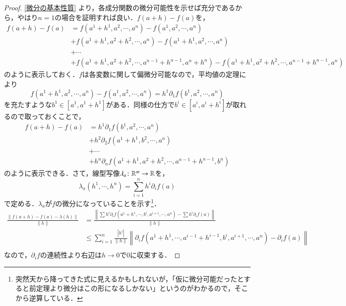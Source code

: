 \begin{proof}
\cref{微分の基本性質} より，各成分関数の微分可能性を示せば充分であるから，やはり$n=1$の場合を証明すれば良い．$f(a+h) - f(a)$を，
\begin{align}
f(a+h) - f(a) &= f(a^1+h^1, a^2, \cdots, a^n) - f(a^1 , a^2, \cdots, a^n) \\
&+ f(a^1+h^1, a^2+h^2, \cdots, a^n) - f(a^1+h^1 , a^2, \cdots, a^n) \\
&+ \cdots \\
&+ f(a^1+h^1, a^2+h^2, \cdots, a^{n-1}+h^{n-1} ,a^n+h^n) - f(a^1+h^1 , a^2+h^2, \cdots, a^{n-1} +h^{n-1}, a^n)
\end{align}のように表示しておく．$f$は各変数に関して偏微分可能なので，平均値の定理により
\begin{equation}
f(a^1+h^1, a^2, \cdots, a^n) - f(a^1 , a^2, \cdots, a^n) = h^1 \partial_1 f(b^1, a^2, \cdots, a^n)
\end{equation}を充たすような$b^1 \in [a^1, a^1 + h^1]$がある．同様の仕方で$b^i \in [a^i, a^i+h^i]$が取れるので取っておくことで，
\begin{align}
f(a+h) - f(a) &= h^1 \partial_1 f(b^1, a^2, \cdots, a^n) \\
&+ h^2 \partial_2 f(a^1+h^1, b^2, \cdots, a^n) \\
&+ \cdots \\
&+ h^n \partial_n f(a^1+h^1, a^2+h^2, \cdots, a^{n-1}+h^{n-1} ,b^n)
\end{align}のように表示できる．さて，線型写像$\lambda_a \colon \mathbb{R}^m \to \mathbb{R}$を，
\begin{equation}
\lambda_a(h^1, \cdots, h^n) = \sum_{i=1}^n h^i \partial_i f(a)
\end{equation}で定める．$\lambda_a$が$f$の微分になっていることを示す\footnote{突然天から降ってきた式に見えるかもしれないが，「仮に微分可能だったとすると前定理より微分はこの形になるしかない」というのがわかるので，そこから逆算している．}．
\begin{align}
\frac{\|f(a+h)- f(a) - \lambda(h)\|}{\|h\|} &= \frac{\left\| \sum h^i \partial_i f(a^1+h^1, \cdots, b^i, a^{i+1}, \cdots, a^n)  - \sum h^i \partial_i f(a) \right\|}{\|h\|} \\
&\leq \sum_{i=1}^n \frac{ \left|h^i\right|}{\|h\|} \left\|  \partial_i f(a^1+h^1, \cdots, a^{i-1} +h^{i-1}, b^i, a^{i+1}, \cdots, a^n)  -  \partial_i f(a) \right\| \\
\end{align}
なので，$\partial_i f$の連続性より右辺は$h\to 0$で0に収束する．
\end{proof}

